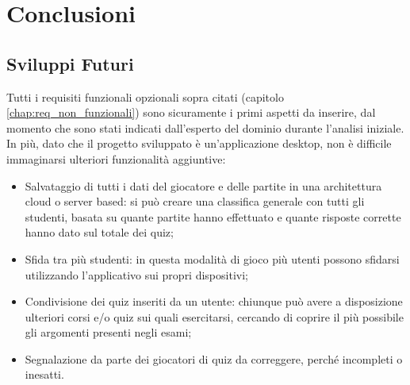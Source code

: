 

\chapter{Conclusioni}\label{conclusioni}

    \section{Sviluppi Futuri}
    Tutti i requisiti funzionali opzionali sopra citati (capitolo \ref{chap:req_non_funzionali}) sono sicuramente i primi aspetti da inserire, dal momento che sono stati indicati dall'esperto del dominio durante l'analisi iniziale.
   In più, dato che il progetto sviluppato è un'applicazione desktop, non è difficile immaginarsi ulteriori funzionalità aggiuntive:
    
    \begin{itemize}
        \item Salvataggio di tutti i dati del giocatore e delle partite in una architettura cloud o server based: si può creare una classifica generale con tutti gli studenti, basata su quante partite hanno effettuato e quante risposte corrette hanno dato sul totale dei quiz;
    
        \item Sfida tra più studenti: in questa modalità di gioco più utenti possono sfidarsi utilizzando l'applicativo sui propri dispositivi;
        
        \item Condivisione dei quiz inseriti da un utente: chiunque può avere a disposizione ulteriori corsi e/o quiz sui quali esercitarsi, cercando di coprire il più possibile gli argomenti presenti negli esami;
        
        \item Segnalazione da parte dei giocatori di quiz da correggere, perché incompleti o inesatti.
    \end{itemize}
    
    

    
    